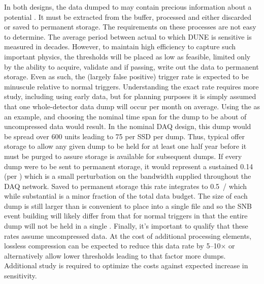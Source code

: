 In both designs, the data dumped to  may contain precious
information about a potential . 
It must be extracted from the buffer, processed and either discarded
or saved to permanent storage. 
The requirements on these processes are not easy to determine.
The average period between actual  to which DUNE is
sensitive is measured in decades. 
However, to maintain high efficiency to capture such important
physics, the thresholds will be placed as low as feasible, limited
only by the ability to acquire, validate and if passing, write out the
data to permanent storage. 
Even as such, the (largely false positive)  trigger rate is
expected to be minuscule relative to normal triggers.
Understanding the exact rate requires more study, including using
early data, but for planning purposes it is simply assumed that one
whole-detector data dump will occur per month on average.
Using the   as an example, and choosing the
nominal time span for the dump to be \snbtime about \spsnbsize of
uncompressed data would result.
In the nominal  DAQ design, this dump would be spread over
600  units leading to \SI{75}{\GB} per SSD per dump.
Thus, typical  offer storage to allow any given dump to be
held for at least one half year before it must be purged to assure
storage is available for subsequent dumps.
If every dump were to be sent to permanent storage, it would represent
a sustained \SI{0.14}{\Gbps} (per ) which is a small
perturbation on the bandwidth supplied throughout the DAQ network. 
Saved to permanent storage this rate integrates to \SI{0.5}{\PB/\year}
which while substantial is a minor fraction of the total data budget.
The size of each dump is still larger than is convenient to place into
a single file and so the SNB event building will likely differ from
that for normal triggers in that the entire dump will not be held in a
single . 
Finally, it's important to qualify that these rates assume
uncompressed data. 
At the cost of additional processing elements, lossless compression
can be expected to reduce this data rate by 5--10$\times$ or
alternatively allow lower thresholds leading to that factor more
dumps.
Additional study is required to optimize the costs against expected
increase in sensitivity.



